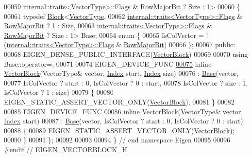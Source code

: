\begin{DoxyCode}
00059                      internal::traits<VectorType>::Flags & RowMajorBit ? Size : 1>
00060 \{
00061     \textcolor{keyword}{typedef} \hyperlink{group___core___module_class_eigen_1_1_block}{Block}<\hyperlink{struct_vector_type}{VectorType},
00062                      \hyperlink{struct_eigen_1_1internal_1_1traits}{internal::traits<VectorType>::Flags} & 
      \hyperlink{group__flags_gae4f56c2a60bbe4bd2e44c5b19cbe8762}{RowMajorBit} ? 1 : Size,
00063                      \hyperlink{struct_eigen_1_1internal_1_1traits}{internal::traits<VectorType>::Flags} & 
      \hyperlink{group__flags_gae4f56c2a60bbe4bd2e44c5b19cbe8762}{RowMajorBit} ? Size : 1> Base;
00064     \textcolor{keyword}{enum} \{
00065       IsColVector = !(\hyperlink{struct_eigen_1_1internal_1_1traits}{internal::traits<VectorType>::Flags} & 
      \hyperlink{group__flags_gae4f56c2a60bbe4bd2e44c5b19cbe8762}{RowMajorBit})
00066     \};
00067   \textcolor{keyword}{public}:
00068     EIGEN\_DENSE\_PUBLIC\_INTERFACE(\hyperlink{group___core___module_class_eigen_1_1_vector_block}{VectorBlock})
00069 
00070     \textcolor{keyword}{using} Base::operator=;
00071 
00074     EIGEN\_DEVICE\_FUNC
\hyperlink{group___core___module_a4bd5eb61b2c420218269a111d717dbb7}{00075}     \textcolor{keyword}{inline} \hyperlink{group___core___module_a4bd5eb61b2c420218269a111d717dbb7}{VectorBlock}(VectorType& vector, \hyperlink{namespace_eigen_a62e77e0933482dafde8fe197d9a2cfde}{Index} start, \hyperlink{namespace_eigen_a62e77e0933482dafde8fe197d9a2cfde}{Index} size)
00076       : \hyperlink{group___core___module}{Base}(vector,
00077              IsColVector ? start : 0, IsColVector ? 0 : start,
00078              IsColVector ? size  : 1, IsColVector ? 1 : size)
00079     \{
00080       EIGEN\_STATIC\_ASSERT\_VECTOR\_ONLY(\hyperlink{group___core___module_class_eigen_1_1_vector_block}{VectorBlock});
00081     \}
00082 
00085     EIGEN\_DEVICE\_FUNC
\hyperlink{group___core___module_a94bcec1eda40d989b2fbcc70f343fa8f}{00086}     \textcolor{keyword}{inline} \hyperlink{group___core___module_a94bcec1eda40d989b2fbcc70f343fa8f}{VectorBlock}(VectorType& vector, \hyperlink{namespace_eigen_a62e77e0933482dafde8fe197d9a2cfde}{Index} start)
00087       : \hyperlink{group___core___module}{Base}(vector, IsColVector ? start : 0, IsColVector ? 0 : start)
00088     \{
00089       EIGEN\_STATIC\_ASSERT\_VECTOR\_ONLY(\hyperlink{group___core___module_class_eigen_1_1_vector_block}{VectorBlock});
00090     \}
00091 \};
00092 
00093 
00094 \} \textcolor{comment}{// end namespace Eigen}
00095 
00096 \textcolor{preprocessor}{#endif // EIGEN\_VECTORBLOCK\_H}
\end{DoxyCode}
